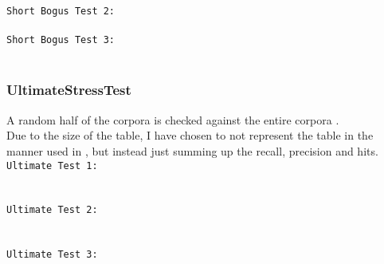 \texttt{Short Bogus Test 2:}\\
\\

\texttt{Short Bogus Test 3:}\\
\\

\clearpage
\subsubsection{UltimateStressTest}
A random half of the corpora is checked against the entire corpora .\\
Due to the size of the table, I have chosen to not represent the table in the manner used in \cite{nr4}, but instead just summing up the recall, precision and hits.\\

\texttt{Ultimate Test 1:}\\\\
\\

\clearpage
\texttt{Ultimate Test 2:}\\\\
\\

\clearpage
\texttt{Ultimate Test 3:}\\\\


\begin{landscape}
\\
\end{landscape}

